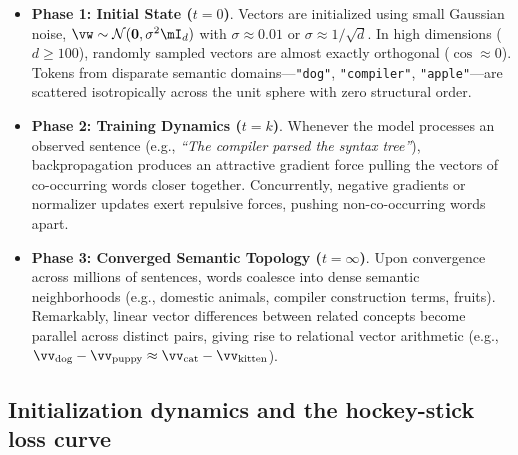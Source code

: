 \documentclass[../../main.tex]{subfiles}
\begin{document}
\begin{itemize}
    \item \textbf{Phase 1: Initial State ($t = 0$)}. Vectors are initialized using small Gaussian noise, $\vw \sim \mathcal{N}(\mathbf{0}, \sigma^2 \mI_d)$ with $\sigma \approx 0.01$ or $\sigma \approx 1/\sqrt{d}$. In high dimensions ($d \ge 100$), randomly sampled vectors are almost exactly orthogonal ($\cos \approx 0$). Tokens from disparate semantic domains---\texttt{"dog"}, \texttt{"compiler"}, \texttt{"apple"}---are scattered isotropically across the unit sphere with zero structural order.
    
    \item \textbf{Phase 2: Training Dynamics ($t = k$)}. Whenever the model processes an observed sentence (e.g., \emph{``The compiler parsed the syntax tree''}), backpropagation produces an attractive gradient force pulling the vectors of co-occurring words closer together. Concurrently, negative gradients or normalizer updates exert repulsive forces, pushing non-co-occurring words apart.
    
    \item \textbf{Phase 3: Converged Semantic Topology ($t = \infty$)}. Upon convergence across millions of sentences, words coalesce into dense semantic neighborhoods (e.g., domestic animals, compiler construction terms, fruits). Remarkably, linear vector differences between related concepts become parallel across distinct pairs, giving rise to relational vector arithmetic (e.g., $\vv_{\text{dog}} - \vv_{\text{puppy}} \approx \vv_{\text{cat}} - \vv_{\text{kitten}}$).
\end{itemize}

\subsection{Initialization dynamics and the hockey-stick loss curve}
\label{subsec:initialization_dynamics}
\end{document}
